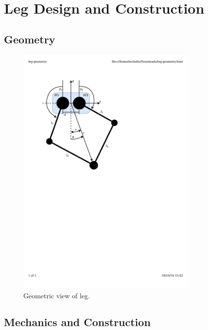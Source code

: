 \chapter{Leg Design and Construction}
\section{Geometry}

\begin{figure}[H]
\centering
\includegraphics[clip, trim=2cm 15cm 7cm 2cm, page = 1, width=0.8\textwidth]{images/geometry/leg-geometry} 
\caption{Geometric view of leg.}
\label{fig:Geometric view of leg}
\end{figure}

\section{Mechanics and Construction}

